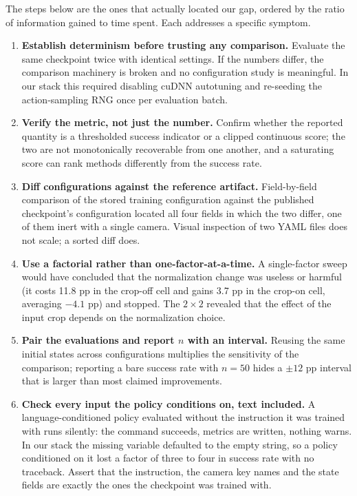 \documentclass[11pt]{article}
\begin{document}
The steps below are the ones that actually located our gap, ordered by the ratio of
information gained to time spent. Each addresses a specific symptom.

\begin{enumerate}
  \item \textbf{Establish determinism before trusting any comparison.} Evaluate the
        same checkpoint twice with identical settings. If the numbers differ, the
        comparison machinery is broken and no configuration study is meaningful.
        In our stack this required disabling cuDNN autotuning and re-seeding the
        action-sampling RNG once per evaluation batch.
  \item \textbf{Verify the metric, not just the number.} Confirm whether the
        reported quantity is a thresholded success indicator or a clipped continuous
        score; the two are not monotonically recoverable from one another, and a
        saturating score can rank methods differently from the success rate.
  \item \textbf{Diff configurations against the reference artifact.} Field-by-field
        comparison of the stored training configuration against the published
        checkpoint's configuration located all four fields in which the two differ, one of them inert with a
        single camera.
        Visual inspection of two YAML files does not scale; a sorted diff does.
  \item \textbf{Use a factorial rather than one-factor-at-a-time.} A single-factor
        sweep would have concluded that the normalization change was useless or
        harmful (it costs 11.8 pp in the crop-off cell and gains 3.7 pp in the
        crop-on cell, averaging $-4.1$ pp) and stopped. The $2\times2$ revealed that the
        effect of the input crop depends on the normalization choice.
  \item \textbf{Pair the evaluations and report $n$ with an interval.} Reusing the
        same initial states across configurations multiplies the sensitivity of the
        comparison; reporting a bare success rate with $n=50$ hides a $\pm12$ pp
        interval that is larger than most claimed improvements.
  \item \textbf{Check every input the policy conditions on, text included.} A
        language-conditioned policy evaluated without the instruction it was trained
        with runs silently: the command succeeds, metrics are written, nothing warns.
        In our stack the missing variable defaulted to the empty string, so a policy
        conditioned on it lost a factor of three to four in success rate with no
        traceback. Assert that the instruction, the camera key names and the state
        fields are exactly the ones the checkpoint was trained with.
\end{enumerate}
\end{document}

